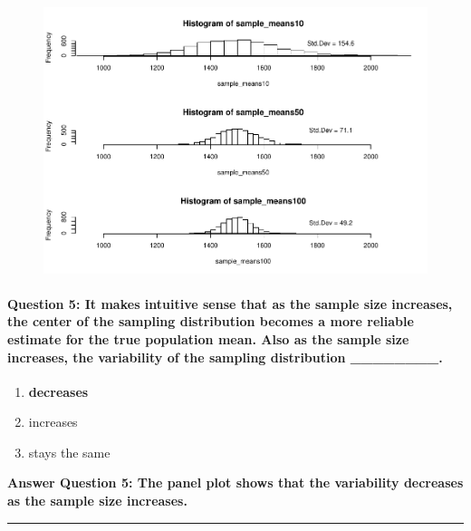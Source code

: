 \documentclass[]{article}
\begin{document}
\begin{figure}[htbp]
\centering
\includegraphics{Lab3A_files/figure-latex/PloSampleSizeText-1.pdf}
\caption{}
\end{figure}

\paragraph{Question 5: It makes intuitive sense that as the sample size
increases, the center of the sampling distribution becomes a more
reliable estimate for the true population mean. Also as the sample size
increases, the variability of the sampling distribution
\_\_\_\_\_\_\_\_.}\label{question-5-it-makes-intuitive-sense-that-as-the-sample-size-increases-the-center-of-the-sampling-distribution-becomes-a-more-reliable-estimate-for-the-true-population-mean.-also-as-the-sample-size-increases-the-variability-of-the-sampling-distribution-ux5fux5fux5fux5fux5fux5fux5fux5f.}

\begin{enumerate}
\def\labelenumi{\Alph{enumi})}
\itemsep1pt\parskip0pt
\item
  \textbf{decreases}
\item
  increases
\item
  stays the same
\end{enumerate}

\textbf{Answer Question 5: The panel plot shows that the variability
decreases as the sample size increases.}

\begin{center}\rule{0.5\linewidth}{\linethickness}\end{center}
\end{document}
